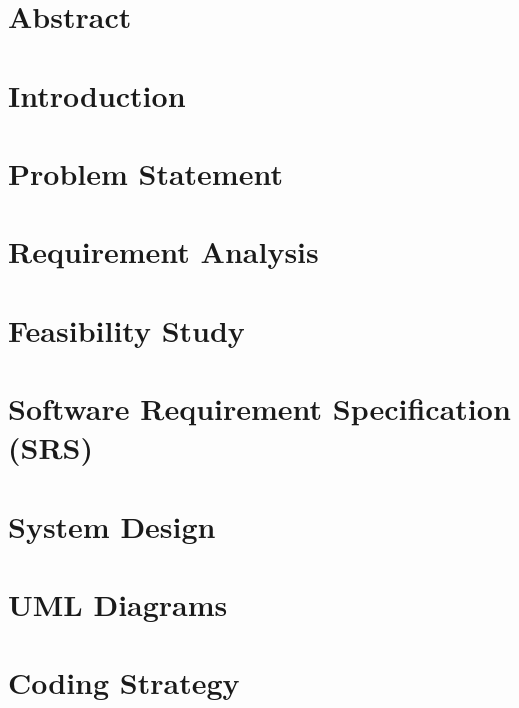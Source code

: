 \documentclass[12pt, a4paper]{article}
\begin{document}



\tableofcontents
\newpage
\listoffigures
\newpage
\listoftables
\newpage

\section*{Abstract}

\newpage

\section{Introduction}


\section{Problem Statement}


\section{Requirement Analysis}


\section{Feasibility Study}


\section{Software Requirement Specification (SRS)}


\section{System Design}


\section{UML Diagrams}


\section{Coding Strategy}

\end{document}
